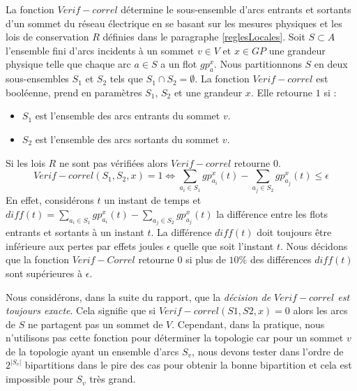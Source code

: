 \label{VerifCorrel}
La fonction $Verif-correl$ d\'etermine le sous-ensemble d'arcs entrants et sortants d'un sommet du r\'eseau \'electrique en se basant sur les mesures physiques et les lois de conservation $R$ d\'efinies dans le paragraphe \ref{reglesLocales}. 
\newline
Soit $S \subset A$ l'ensemble  fini d'arcs incidents \`a un sommet  $v \in V$ et 
$x \in GP$ une grandeur physique 
telle que chaque arc $a \in S$ a un flot $gp_{a}^{x}$.
Nous partitionnons $S$ en deux sous-ensembles $S_1$ et $S_2$ tels que $S_1 \cap S_2  = \emptyset$.
\newline
La fonction $Verif-correl$ est bool\'eenne, prend en param\`etres $S_1$, $S_2$ et une grandeur $x$. 
Elle retourne $1$ si :
\begin{itemize}
	\item $S_1$ est l'ensemble des arcs entrants du sommet $v$.
	\item $S_2$ est l'ensemble des arcs sortants du sommet $v$.
\end{itemize} 
Si les lois $R$ ne sont pas v\'erifi\'ees alors $Verif-correl$ retourne $0$.
$$
Verif-correl(S_1, S_2, x) = 1 \Leftrightarrow  \sum_{ a_i \in S_1} gp_{a_i}^{x}(t) - \sum_{a_ j\in S_2} gp_{a_j}^{x}(t)  \le \epsilon 
$$
En effet, consid\'erons $t$ un instant de temps et 
		$diff(t) =  \sum_{ a_i \in S_1} gp_{a_i}^{x}(t) - \sum_{a_ j\in S_2} gp_{a_j}^{x}(t)$ la diff\'erence entre les flots entrants et sortants \`a un instant $t$.
La diff\'erence $diff(t)$ doit toujours \^etre inf\'erieure aux pertes par effets joules $\epsilon$ quelle que soit l'instant $t$. 
\newline
Nous d\'ecidons que la fonction $Verif-Correl$ retourne $0$ si plus de $10\%$ des diff\'erences $diff(t)$ sont sup\'erieures \`a  $\epsilon$.
\newline


Nous consid\'erons, dans la suite du rapport, que la {\em d\'ecision de $Verif-correl$ est toujours exacte}. Cela signifie que 
si $Verif-correl(S1, S2, x) = 0$ alors les arcs de $S$ ne partagent pas un sommet de $V$.
Cependant, dans la pratique, nous n'utilisons pas cette fonction pour d\'eterminer la topologie car pour un sommet $v$ de la topologie ayant un ensemble d'arcs $S_v$, nous devons  tester dans l'ordre de $2^{|S_{v}|}$ bipartitions dans le pire des cas pour obtenir la bonne bipartition et cela est impossible pour $S_{v}$ tr\`es grand. 
